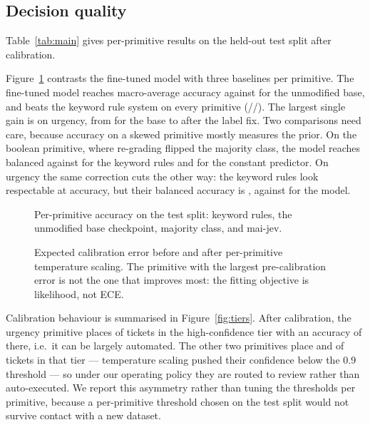 \documentclass[11pt,a4paper]{article}
\begin{document}
\subsection{Decision quality}

Table~\ref{tab:main} gives per-primitive results on the held-out test split after calibration.

\begin{table}[t]
\centering
\caption{Per-primitive results on the held-out test split (\RowsTest{} rows) after temperature scaling. ``bal.\ acc'' is accuracy macro-averaged over gold classes; ``soft acc'' is the mean probability assigned to the gold option. Lower ECE is better.}
\label{tab:main}

\end{table}

Figure~\ref{fig:acc} contrasts the fine-tuned model with three baselines per primitive. The fine-tuned model reaches \MacroAcc{} macro-average accuracy against \OrigAccMacro{} for the unmodified base, and beats the keyword rule system on every primitive (\RulesAccChoice/\RulesAccScore/\RulesAccNoul{}). The largest single gain is on urgency, from \OrigAccScore{} for the base to \AccScore{} after the label fix. Two comparisons need care, because accuracy on a skewed primitive mostly measures the prior. On the boolean primitive, where re-grading flipped the majority class, the model reaches \BAccNoul{} balanced against \RulesBAccNoul{} for the keyword rules and \MajAccNoul{} for the constant predictor. On urgency the same correction cuts the other way: the keyword rules look respectable at \RulesAccScore{} accuracy, but their balanced accuracy is \RulesBAccScore{}, against \BAccScore{} for the model.

\begin{figure}[t]
\centering

\caption{Per-primitive accuracy on the test split: keyword rules, the unmodified base checkpoint, majority class, and mai-jev.}
\label{fig:acc}
\end{figure}

\begin{figure}[t]
\centering

\caption{Expected calibration error before and after per-primitive temperature scaling. The primitive with the largest pre-calibration error is not the one that improves most: the fitting objective is likelihood, not ECE.}
\label{fig:ece}
\end{figure}

Calibration behaviour is summarised in Figure~\ref{fig:tiers}. After calibration, the urgency primitive places \AutoCovScore{} of tickets in the high-confidence tier with an accuracy of \AutoAccScore{} there, i.e.\ it can be largely automated. The other two primitives place \AutoCovChoice{} and \AutoCovNoul{} of tickets in that tier --- temperature scaling pushed their confidence below the \num{0.9} threshold --- so under our operating policy they are routed to review rather than auto-executed. We report this asymmetry rather than tuning the thresholds per primitive, because a per-primitive threshold chosen on the test split would not survive contact with a new dataset.
\end{document}
